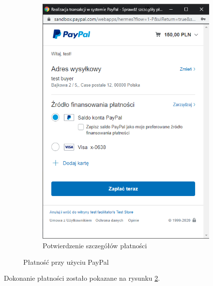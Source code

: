 \documentclass[12pt]{article}
\numberwithin{figure}{section}
\begin{document}
\begin{sloppypar}
\begin{figure}[h]
\begin{subfigure}{.5\textwidth}
      \includegraphics[width=.9\linewidth]{images/chapter_4/pay2.png}
      \caption{Potwierdzenie szczegółów płatności}
      \label{fig:paypal2}
    \end{subfigure}
    \caption{Płatność przy użyciu PayPal}
    \label{fig:paypal}
\end{figure}

Dokonanie płatności zostało pokazane na rysunku \ref{fig:paypal}.


\end{sloppypar}
\end{document}
